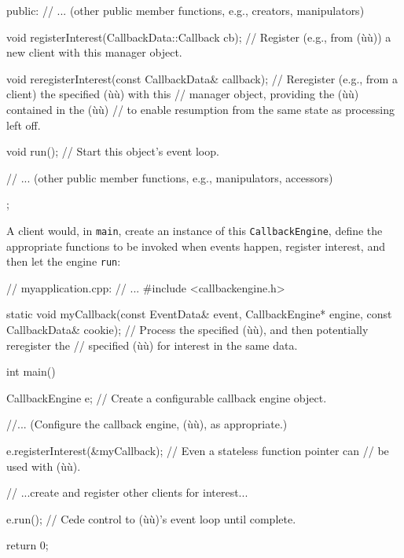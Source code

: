 \begin{emcppslisting}[emcppsbatch=e6]
{public:
    // ...   (other public member functions, e.g., creators, manipulators)

    void registerInterest(CallbackData::Callback cb);
        // Register (e.g., from (ù{}ù)) a new client with this manager object.

    void reregisterInterest(const CallbackData& callback);
        // Reregister (e.g., from a client) the specified (ù{}ù) with this
        // manager object, providing the (ù{}ù) contained in the (ù{}ù)
        // to enable resumption from the same state as processing left off.

    void run();
        // Start this object's event loop.

    // ...  (other public member functions, e.g., manipulators, accessors)
};
\end{emcppslisting}

\noindent A client would, in \lstinline!main!, create an instance of this
\lstinline!CallbackEngine!, define the appropriate functions to be invoked
when events happen, register interest, and then let the engine
\lstinline!run!:

\begin{emcppslisting}[emcppsbatch=e6]
// myapplication.cpp:
// ...
#include <callbackengine.h>

static void myCallback(const EventData&    event,
                       CallbackEngine*     engine,
                       const CallbackData& cookie);
    // Process the specified (ù{}ù), and then potentially reregister the
    // specified (ù{}ù) for interest in the same data.

int main()
{
   CallbackEngine e;  // Create a configurable callback engine object.

   //...     (Configure the callback engine, (ù{}ù), as appropriate.)

   e.registerInterest(&myCallback);  // Even a stateless function pointer can
                                     // be used with (ù{}ù).

   // ...create and register other clients for interest...

   e.run();    // Cede control to (ù{}ù)'s event loop until complete.

   return 0;
}
\end{emcppslisting}

